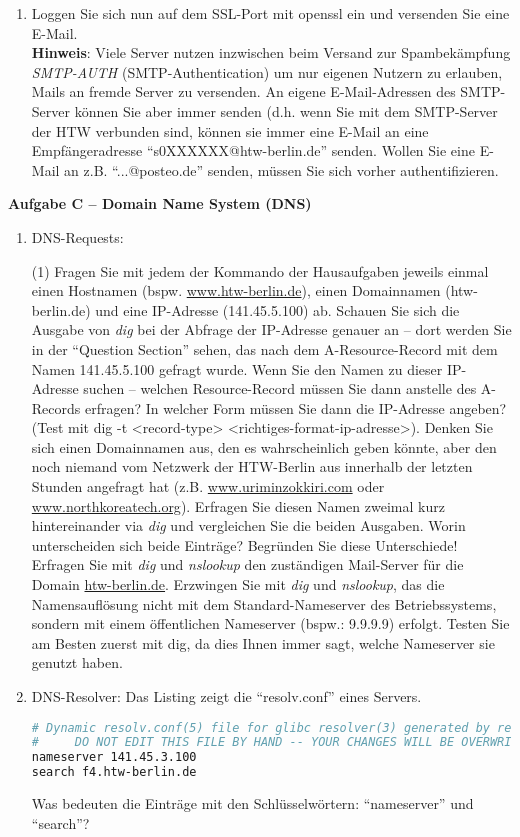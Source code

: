 \documentclass[paper=a4,fontsize=11pt]{scrartcl}%
\numberwithin{equation}{section}
\begin{document}
\begin{enumerate}
 	\item Loggen Sie sich nun auf dem SSL-Port mit openssl ein und versenden Sie eine E-Mail.\\
 	\textbf{Hinweis}: Viele Server nutzen inzwischen beim Versand zur Spambekämpfung \emph{SMTP-AUTH} (SMTP-Authentication) um nur eigenen Nutzern zu erlauben, Mails an fremde Server zu versenden. An eigene E-Mail-Adressen des SMTP-Server können Sie aber immer senden (d.h. wenn Sie mit dem SMTP-Server der HTW verbunden sind, können sie immer eine E-Mail an eine Empfängeradresse \enquote{s0XXXXXX@htw-berlin.de} senden. Wollen Sie eine E-Mail an z.B. \enquote{...@posteo.de} senden, müssen Sie sich vorher authentifizieren.
\end{enumerate}

\begin{center}\Large{\textbf{Aufgabe C -- Domain Name System (DNS)}}\end{center}\vskip0.25in
\begin{enumerate}
	\item DNS-Requests:
\begin{tasks}(1)
		\task Fragen Sie mit jedem der Kommando der Hausaufgaben jeweils einmal einen Hostnamen (bspw. \url{www.htw-berlin.de}), einen Domainnamen (htw-berlin.de) und eine IP-Adresse (141.45.5.100) ab.
		\task Schauen Sie sich die Ausgabe von \emph{dig} bei der Abfrage der IP-Adresse genauer an -- dort werden Sie in der \enquote{Question Section} sehen, das nach dem A-Resource-Record mit dem Namen 141.45.5.100 gefragt wurde. Wenn Sie den Namen zu dieser IP-Adresse suchen -- welchen Resource-Record müssen Sie dann anstelle des A-Records erfragen? 
		\task In welcher Form müssen Sie dann die IP-Adresse angeben? (Test mit dig -t <record-type> <richtiges-format-ip-adresse>).
		\task Denken Sie sich einen Domainnamen aus, den es wahrscheinlich geben könnte, aber den noch niemand vom Netzwerk der HTW-Berlin aus innerhalb der letzten Stunden angefragt hat (z.B. \url{www.uriminzokkiri.com} oder \url{www.northkoreatech.org}). Erfragen Sie diesen Namen zweimal kurz hintereinander via \emph{dig} und vergleichen Sie die beiden Ausgaben. Worin unterscheiden sich beide Einträge? Begründen Sie diese Unterschiede!
		\task Erfragen Sie mit \emph{dig} und \emph{nslookup} den zuständigen Mail-Server für die Domain \url{htw-berlin.de}.
		\task Erzwingen Sie mit \emph{dig} und \emph{nslookup}, das die Namensauflösung nicht mit dem Standard-Nameserver des Betriebssystems, sondern mit einem öffentlichen Nameserver (bspw.: 9.9.9.9) erfolgt. Testen Sie am Besten zuerst mit dig, da dies Ihnen immer sagt, welche Nameserver sie genutzt haben.
	\end{tasks}
	\item DNS-Resolver: Das Listing zeigt die \enquote{resolv.conf} eines Servers. 
	\begin{lstlisting}[style=Bash, language=Bash]
# Dynamic resolv.conf(5) file for glibc resolver(3) generated by resolvconf(8)
#     DO NOT EDIT THIS FILE BY HAND -- YOUR CHANGES WILL BE OVERWRITTEN
nameserver 141.45.3.100
search f4.htw-berlin.de
\end{lstlisting} \label{dns}
Was bedeuten die Einträge mit den Schlüsselwörtern: \enquote{nameserver} und \enquote{search}?
\end{enumerate}
\end{document}
